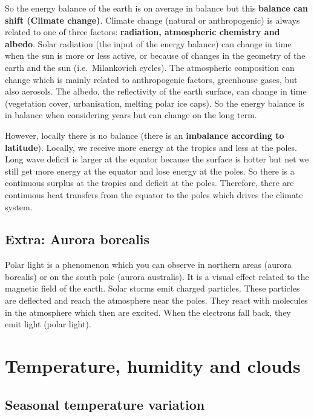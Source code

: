 \documentclass[oneside]{book}
\begin{document}
So the energy balance of the earth is on average in balance but this
\textbf{balance can shift (Climate change)}. Climate change (natural or
anthropogenic) is always related to one of three factors:
\textbf{radiation, atmospheric chemistry and albedo}. Solar radiation
(the input of the energy balance) can change in time when the sun is
more or less active, or because of changes in the geometry of the earth
and the sun (i.e.~Milankovich cycles). The atmospheric composition can
change which is mainly related to anthropogenic factors, greenhouse
gases, but also aerosols. The albedo, the reflectivity of the earth
surface, can change in time (vegetation cover, urbanisation, melting
polar ice caps). So the energy balance is in balance when considering
years but can change on the long term.

However, locally there is no balance (there is an \textbf{imbalance
according to latitude}). Locally, we receive more energy at the tropics
and less at the poles. Long wave deficit is larger at the equator
because the surface is hotter but net we still get more energy at the
equator and lose energy at the poles. So there is a continuous surplus
at the tropics and deficit at the poles. Therefore, there are continuous
heat transfers from the equator to the poles which drives the climate
system.

\section{Extra: Aurora borealis}\label{extra-aurora-borealis}

Polar light is a phenomenon which you can observe in northern areas
(aurora borealis) or on the south pole (aurora australis). It is a
visual effect related to the magnetic field of the earth. Solar storms
emit charged particles. These particles are deflected and reach the
atmosphere near the poles. They react with molecules in the atmosphere
which then are excited. When the electrons fall back, they emit light
(polar light).

\chapter{Temperature, humidity and
clouds}\label{temperature-humidity-and-clouds}


\section{Seasonal temperature
variation}\label{seasonal-temperature-variation}
\end{document}
